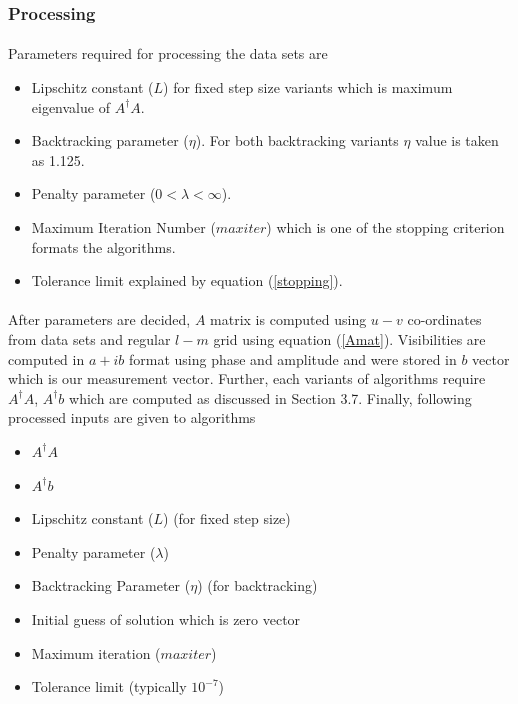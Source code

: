 \subsubsection{Processing}

\paragraph{}Parameters required for processing the data sets are
\begin{itemize}
 \item Lipschitz constant ($L$) for fixed step size variants which is maximum
	eigenvalue of $A^\dagger A$.
 \item Backtracking parameter ($\eta$). For both backtracking variants $\eta$ value
       is taken as 1.125.
 \item Penalty parameter ($0 < \lambda < \infty$).
 \item Maximum Iteration Number ($maxiter$) which is one of the stopping criterion formats 
	the algorithms.
 \item Tolerance limit explained by equation (\ref{stopping}).
\end{itemize}

\paragraph{}
After parameters are decided, $A$ matrix is computed using $u-v$ co-ordinates from data sets
and regular $l-m$ grid using equation (\ref{Amat}). Visibilities are computed in $a+ib$ format
using phase and amplitude and were stored in $b$ vector which is our measurement vector.  
Further, each variants of algorithms require $A^ \dagger A$, $A^ \dagger b$ 
which are computed as discussed in Section 3.7. Finally, following processed inputs are
given to algorithms
\begin{itemize}
 \item $A^\dagger A$
 \item $A^\dagger b$
 \item Lipschitz constant ($L$) (for fixed step size)
 \item Penalty parameter ($\lambda$) 
 \item Backtracking Parameter ($\eta$) (for backtracking)
 \item Initial guess of solution which is zero vector
 \item Maximum iteration ($maxiter$)
 \item Tolerance limit (typically $10^{-7}$) 
\end{itemize}


